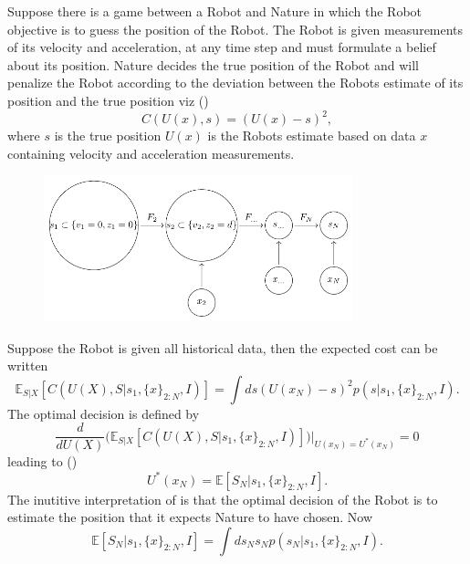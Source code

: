 \begin{example}
	Suppose there is a game between a Robot and Nature in which the Robot objective is to guess the position of the Robot. The Robot is given measurements of its velocity and acceleration, at any time step and must formulate a belief about its position. Nature decides the true position of the Robot and will penalize the Robot according to the deviation between the Robots estimate of its position and the true position viz ()
	\begin{equation}
		C(U(x),s) = (U(x)-s)^2,
	\end{equation}
	where $s$ is the true position $U(x)$ is the Robots estimate based on data $x$ containing velocity and acceleration measurements. 
	\begin{figure}[H]
		\centering
		\includegraphics[width = 0.8\textwidth]{figures/graph.pdf}
		\caption{}
		\label{fig:1}
	\end{figure}
	Suppose the Robot is given all historical data, then the expected cost can be written
	\begin{equation}
		\mathbb{E}_{S|X}[C(U(X),S|s_1,\{x\}_{2:N},I)] = \int ds (U(x_N)-s)^2p(s|s_1,\{x\}_{2:N},I).
	\end{equation}
	The optimal decision is defined by
	\begin{equation}
		\frac{d}{dU(X)}\bigg(\mathbb{E}_{S|X}[C(U(X),S|s_1,\{x\}_{2:N},I)]\bigg)\bigg|_{U(x_N)=U^*(x_N)} = 0
	\end{equation}
	leading to ()
	\begin{equation}
		U^*(x_N) = \mathbb{E}[S_{N}|s_1,\{x\}_{2:N},I].
		\label{eq:dr}
	\end{equation}
	The inutitive interpretation of  is that the optimal decision of the Robot is to estimate the position that it expects Nature to have chosen. Now
	\begin{equation}
		\mathbb{E}[S_{N}|s_1,\{x\}_{2:N},I] = \int ds_{N} s_N p(s_N|s_1,\{x\}_{2:N},I).
		\label{eq:a5}

\end{equation}
\end{example}
